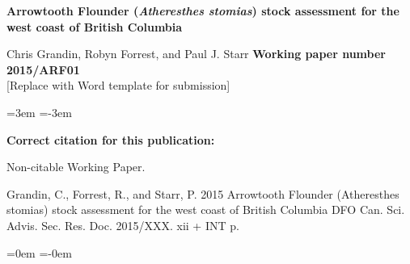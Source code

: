 
\thispagestyle{fancyplain}

\begin{flushleft}
\LARGE \textbf{Arrowtooth Flounder ({\bf \emph{Atheresthes stomias}}) stock assessment for the west coast of British Columbia}

\end{flushleft}
\vfill
{\Large Chris Grandin, Robyn Forrest, and Paul J. Starr}
\vfill
\vfill
\vfill
{\LARGE \textbf{Working paper number 2015/ARF01}}\\
\vspace{2cm}
[Replace with Word template for submission]
\vfill
\clearpage

\renewcommand{\contentsname}{\bf \large \vspace{-25mm} TABLE OF CONTENTS}

\begin{center}
\tableofcontents
\end{center}
\newpage

\leftskip=3em	%
\parindent=-3em

{\bf Correct citation for this publication:}

Non-citable Working Paper.	%

Grandin, C., Forrest, R., and Starr, P. 2015
Arrowtooth Flounder (Atheresthes stomias) stock assessment for the west coast of British Columbia
DFO Can. Sci. Advis. Sec. Res. Doc. 2015/XXX. xii + INT p.

\leftskip=0em	%
\parindent=-0em
